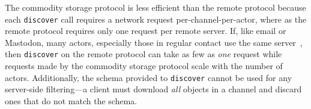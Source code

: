 


The commodity storage protocol is less efficient than the remote protocol because each
\texttt{discover} call requires a network request per-channel-per-actor,
where as the remote protocol requires only one request per remote server.
If, like email or Mastodon, many actors, especially those in regular contact
use the same server~\cite{mastodonchallenges},
then \texttt{discover} on the remote protocol can take as
few as \emph{one} request while requests made by
the commodity storage protocol scale with the number of actors.
Additionally, the schema provided to \texttt{discover} cannot be used for any
server-side filtering---a client must download \emph{all} objects in a channel
and discard ones that do not match the schema.


